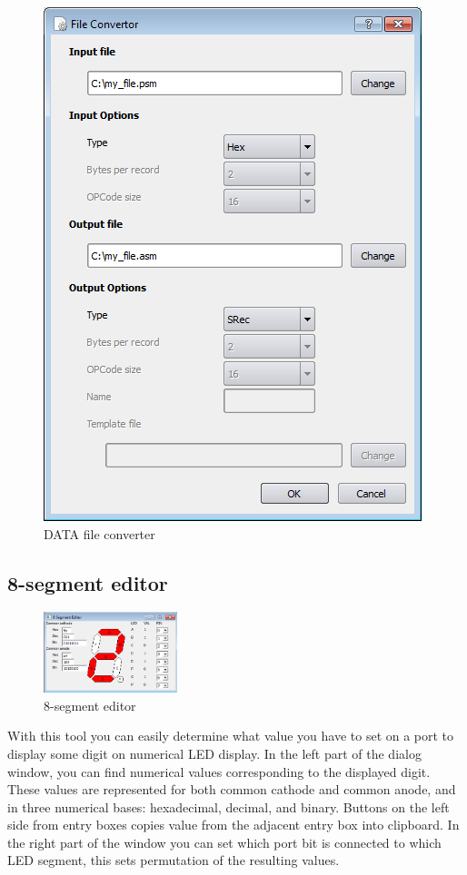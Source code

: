         \enlargethispage{6\baselineskip}
        \begin{figure}[h]
            \centering
            \includegraphics[width=.5\textwidth]{img/DATA_converter.png}
            \caption{DATA file converter}
        \end{figure}

    \clearpage
    \subsection{8-segment editor}
        \begin{figure}
            \centering
            \includegraphics[width=110pt]{img/8segment.png}
            \caption{8-segment editor}
        \end{figure}
        With this tool you can easily determine what value you have to set on a port to display some digit on numerical LED display. In the left part of the dialog window, you can find numerical values corresponding to the displayed digit. These values are represented for both common cathode and common anode, and in three numerical bases: hexadecimal, decimal, and binary. Buttons on the left side from entry boxes copies value from the adjacent entry box into clipboard. In the right part of the window you can set which port bit is connected to which LED segment, this sets permutation of the resulting values.

